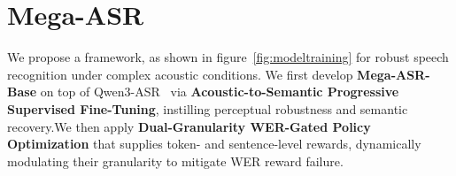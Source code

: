 \documentclass{llmxive}
\begin{document}


\vspace{-2mm}
\section{Mega-ASR}
\vspace{-2mm}
We propose a framework, as shown in figure~\ref{fig:modeltraining} for robust speech recognition under complex acoustic conditions. We first develop \textbf{Mega-ASR-Base} on top of Qwen3-ASR~\citep{qwen3-asr} via \textbf{Acoustic-to-Semantic Progressive Supervised Fine-Tuning}, instilling perceptual robustness and semantic recovery.We then apply \textbf{Dual-Granularity WER-Gated Policy Optimization} that supplies token- and sentence-level rewards, dynamically modulating their granularity to mitigate WER reward failure.
\end{document}
